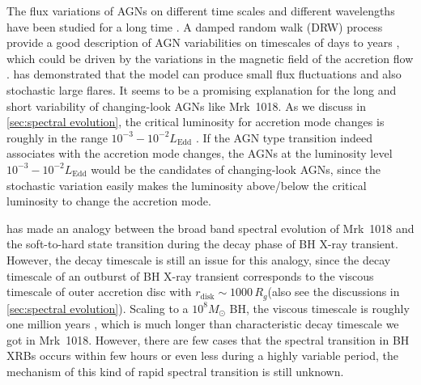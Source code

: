 \documentclass[twocolumn]{aastex63}
\begin{document}
The flux variations of AGNs on different time scales and different wavelengths have been studied for a long time \citep[see reviews in ][]{1997ARA&A..35..445U}. A damped random walk (DRW) process provide a good description of AGN variabilities on timescales of days to years \citep[e.g.][]{2010ApJ...721.1014M,2011ApJ...730...52K}, which could be driven by the variations in the magnetic field of the accretion flow \citep{2004MNRAS.348..111K,2006MNRAS.368..379M,2007A&A...466..793J}. \citet{2004MNRAS.348..111K} has demonstrated that the model can produce small flux fluctuations and also stochastic large flares. It seems to be a promising explanation for the long and short variability of changing-look AGNs like Mrk~1018. As we discuss in \autoref{sec:spectral evolution}, the critical luminosity for accretion mode changes is roughly in the range $10^{-3}-10^{-2}L_\mathrm{Edd}$ \citep[see also ][]{2019arXiv191203972L}. If the AGN type transition indeed associates with the accretion mode changes, the AGNs at the luminosity level $10^{-3}-10^{-2}L_\mathrm{Edd}$ would be the candidates of changing-look AGNs, since the stochastic variation easily makes the luminosity above/below the critical luminosity to change the accretion mode. 

\citet{2018MNRAS.480.3898N} has made an analogy between the broad band spectral evolution of Mrk~1018 and the soft-to-hard state transition during the decay phase of BH X-ray transient. However, the decay timescale is still an issue for this analogy, since the decay timescale of an outburst of BH X-ray transient corresponds to the viscous timescale of outer accretion disc with $r_\mathrm{disk}\sim 1000\, R_g$(also see the discussions in \autoref{sec:spectral evolution}). Scaling to a $10^{8}M_{\odot}$ BH, the viscous timescale is roughly one million years \citep{2012MmSAI..83..469L,2018MNRAS.475.1190Y}, which is much longer than characteristic decay timescale we got in Mrk~1018. However, there are few cases that the spectral transition in BH XRBs occurs within few hours or even less \citep{2011A&A...533A...8B,2020A&A...634A..94K} during a highly variable period, the mechanism of this kind of rapid spectral transition is still unknown. 
\end{document}
